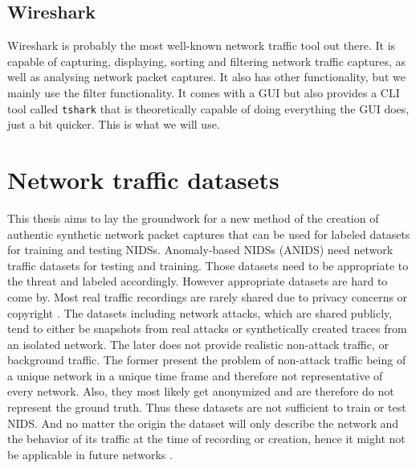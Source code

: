 \documentclass[
	ngerman,
	ruledheaders=section,%
	class=report,%
	thesis={type=bachelor},%
	accentcolor=9c,%
	custommargins=true,%
	marginpar=false,%
	parskip=half-,%
	fontsize=11pt,%
	twoside
]{tudapub}
\let\code\texttt
\begin{document}
\subsection{Wireshark}
\label{sec:wireshark}

Wireshark is probably the most well-known network traffic tool out there.
It is capable of capturing, displaying, sorting and filtering network traffic captures, as well as analysing network packet captures.
It also has other functionality, but we mainly use the filter functionality.
It comes with a GUI but also provides a CLI tool called \code{tshark} that is theoretically capable of doing everything the GUI does, just a bit quicker.
This is what we will use.

\section{Network traffic datasets}
\label{sec:networkTrafficDatasets}

This thesis aims to lay the groundwork for a new method of the creation of authentic synthetic network packet captures
that can be used for labeled datasets for training and testing NIDSs.
Anomaly-based NIDSs (ANIDS) need network traffic datasets for testing and training.
Those datasets need to be appropriate to the threat and labeled accordingly.
However appropriate datasets are hard to come by.
Most real traffic recordings are rarely shared due to privacy concerns \cite{ringFlowbasedNetworkTraffic2019a} or copyright \cite{corderoID2TDIYDataset2015}.
The datasets including network attacks,
which are shared publicly,
tend to either be snapshots from real attacks or synthetically created traces from an isolated network.
The later does not provide realistic non-attack traffic, or background traffic.
The former present the problem of non-attack traffic being of a unique network in a unique time frame and therefore not representative of every network.
Also, they most likely get anonymized and are therefore do not represent the ground truth.
Thus these datasets are not sufficient to train or test NIDS.
And no matter the origin the dataset will only describe the network and the behavior of its traffic at the time of recording or creation, hence it might not be applicable in future networks \cite{ringFlowbasedNetworkTraffic2019a}.


\end{document}
